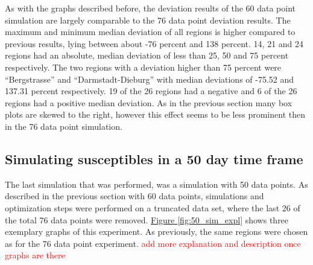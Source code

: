 As with the graphs described before, the deviation results of the 60 data point simulation are largely comparable to the 76
data point deviation results. The maximum and minimum median deviation of all regions is higher compared to previous results,
lying between about -76 percent and 138 percent. 14, 21 and 24 regions had an absolute, median deviation of less than
25, 50 and 75 percent respectively. The two regions with a deviation higher than 75 percent were ``Bergstrasse'' and
``Darmstadt-Dieburg'' with median deviations of -75.52 and 137.31 percent respectively.
19 of the 26 regions had a negative and 6 of the 26 regions had a positive median deviation.
As in the previous section many box plots are skewed to the right, however this effect seems to be less prominent then in
the 76 data point simulation.


\subsection{Simulating susceptibles in a 50 day time frame}
The last simulation that was performed, was a simulation with 50 data points. As described in the previous section with
60 data points, simulations and optimization steps were performed on a truncated data set, where the last 26 of the total
76 data points were removed. \hyperref[fig:50_sim_expl]{Figure \ref*{fig:50_sim_expl}} shows three exemplary graphs of this
experiment. As previously, the same regions were chosen as for the 76 data point experiment. 
\textcolor{red}{add more explanation and description once graphs are there}

